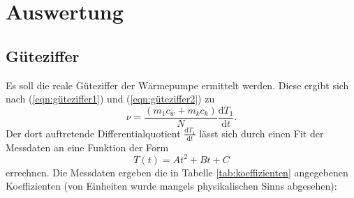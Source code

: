 \section{Auswertung}
\label{sec:auswertung}



\subsection{Güteziffer}
  \label{subsec:güteziffer}
  Es soll die reale Güteziffer der Wärmepumpe ermittelt werden. Diese ergibt sich nach (\ref{eqn:güteziffer1}) und (\ref{eqn:güteziffer2}) zu
  \begin{equation}
    ν = \frac{(m_{1} c_w + m_k c_k)}{N}\frac {\mathrm{d}T_{1}}{\mathrm{d}t}.
  \end{equation}
  Der dort auftretende Differentialquotient $\frac {\mathrm{d}T_{1}}{\mathrm{d}t}$ lässt sich durch einen Fit der Messdaten an eine Funktion der Form
  \begin{equation}
    T(t) = A t^2 + Bt + C
  \end{equation}
  errechnen. Die Messdaten ergeben die in Tabelle \ref{tab:koeffizienten} angegebenen Koeffizienten (von Einheiten wurde mangels physikalischen Sinns abgesehen):

